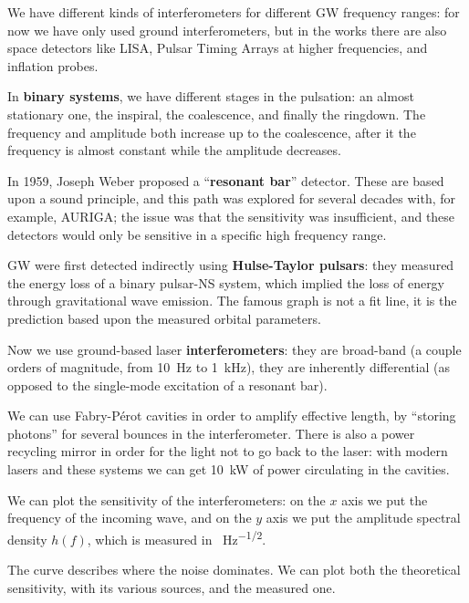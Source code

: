 \documentclass[main.tex]{subfiles}
\begin{document}

We have different kinds of interferometers for different GW frequency ranges: for now we have only used ground interferometers, but in the works there are also space detectors like LISA, Pulsar Timing Arrays at higher frequencies, and inflation probes.

In \textbf{binary systems}, we have different stages in the pulsation: an almost stationary one, the inspiral, the coalescence, and finally the ringdown.
The frequency and amplitude both increase up to the coalescence, after it the frequency is almost constant while the amplitude decreases.

In 1959, Joseph Weber proposed a ``\textbf{resonant bar}'' detector. These are based upon a sound principle, and this path was explored for several decades with, for example, AURIGA; the issue was that the sensitivity was insufficient, and these detectors would only be sensitive in a specific high frequency range.

GW were first detected indirectly using \textbf{Hulse-Taylor pulsars}: they measured the energy loss of a binary pulsar-NS system, which implied the loss of energy through gravitational wave emission.
The famous graph is not a fit line, it is the prediction based upon the measured orbital parameters.

Now we use ground-based laser \textbf{interferometers}: they are broad-band (a couple orders of magnitude, from \SI{10}{Hz} to \SI{1}{kHz}), they are inherently differential (as opposed to the single-mode excitation of a resonant bar). 

We can use Fabry-Pérot cavities in order to amplify effective length, by ``storing photons'' for several bounces in the interferometer. 
There is also a power recycling mirror in order for the light not to go back to the laser: with modern lasers and these systems we can get \SI{10}{kW} of power circulating in the cavities.

We can plot the sensitivity of the interferometers:
on the \(x\) axis we put the frequency of the incoming wave, and
on the \(y\) axis we put the amplitude spectral density \(h(f)\), which is measured in \SI{}{Hz^{-1/2}}. 

The curve describes where the noise dominates. 
We can plot both the theoretical sensitivity, with its various sources, and the measured one.
\end{document}
